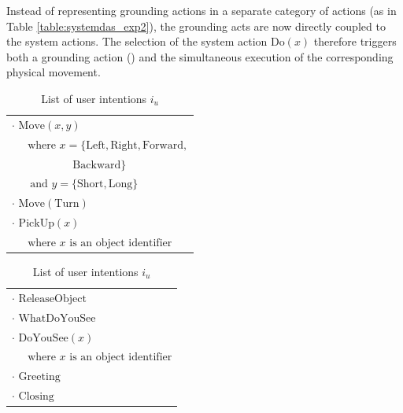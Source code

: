 Instead of representing grounding actions in a separate category of actions (as in Table \ref{table:systemdas_exp2}), the grounding acts are now directly coupled to the system actions. The selection of the system action $\mathrm{Do}(x)$ therefore triggers both a grounding action () and the simultaneous execution of the corresponding physical movement. 

\renewcommand{\arraystretch}{1.3}

\begin{table}[p!]
\begin{footnotesize}
\begin{tabular}{p{60mm}} 
$\cdot$ $\mathrm{Move}(x,y) $ \\ $ \ \ \ \ \ \text{ where } x=\{\mathrm{Left,Right,Forward,}$ \\ $\ \ \ \ \ \ \ \ \ \ \ \ \ \ \ \ \ \ \ \ \ \ \ \ \ \mathrm{Backward}\} $ \\ $ \ \ \ \ \ \ \text{ and } y = \{\mathrm{Short, Long}\}$ \\
$\cdot$ $\mathrm{Move(Turn)} $ \\
$\cdot$ $\mathrm{PickUp}(x) $ \\ $\ \ \ \ \  \text{ where } x \text{ is an object identifier}$ 
\end{tabular}
\hspace{2cm}
\begin{tabular}{p{60mm}} 
$\cdot$ $\mathrm{ReleaseObject} $ \\
$\cdot$ $\mathrm{WhatDoYouSee}$ \\
$\cdot$ $\mathrm{DoYouSee}(x) $ \\ $\ \ \ \ \  \text{ where } x \text{ is an object identifier}$ \\
$\cdot$ $\mathrm{Greeting}$ \\
$\cdot$ $\mathrm{Closing}$ 
\end{tabular}
\end{footnotesize}
 \caption{List of user intentions $i_u$} 
\label{table:userintents_exp3}
\end{table}


